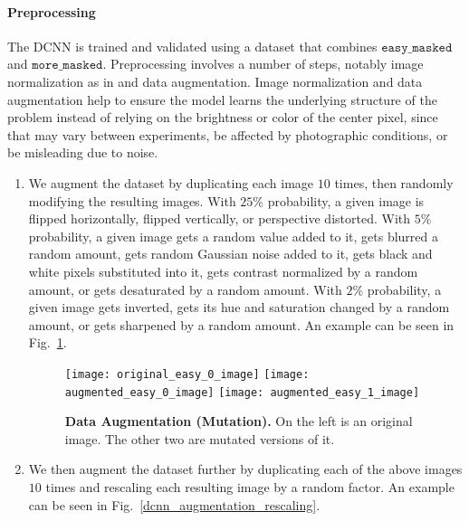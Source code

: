 \documentclass[10pt,letterpaper]{article}
\begin{document}
        \paragraph*{Preprocessing}
            The DCNN is trained and validated using a dataset that combines $\texttt{easy\_masked}$ and $\texttt{more\_masked}$. Preprocessing involves a number of steps, notably image normalization as in \cite{Valen} and data augmentation. Image normalization and data augmentation help to ensure the model learns the underlying structure of the problem instead of relying on the brightness or color of the center pixel, since that may vary between experiments, be affected by photographic conditions, or be misleading due to noise.
    
            \begin{enumerate}
                \item
                    We augment the dataset by duplicating each image $10$ times, then randomly modifying the resulting images. With $25\%$ probability, a given image is flipped horizontally, flipped vertically, or perspective distorted. With $5\%$ probability, a given image gets a random value added to it, gets blurred a random amount, gets random Gaussian noise added to it, gets black and white pixels substituted into it, gets contrast normalized by a random amount, or gets desaturated by a random amount. With $2\%$ probability, a given image gets inverted, gets its hue and saturation changed by a random amount, or gets sharpened by a random amount. An example can be seen in Fig.~\ref{dcnn_augmentation_mutation}.
        
                \begin{figure}[h]
                    \texttt{[image: original\_easy\_0\_image]}
                    \texttt{[image: augmented\_easy\_0\_image]}
                    \texttt{[image: augmented\_easy\_1\_image]}
                    \caption{{\bf Data Augmentation (Mutation).} On the left is an original image. The other two are mutated versions of it.}
                    \label{dcnn_augmentation_mutation}
                \end{figure}
    
            \item
                We then augment the dataset further by duplicating each of the above images $10$ times and rescaling each resulting image by a random factor. An example can be seen in Fig.~\ref{dcnn_augmentation_rescaling}.
    

\end{enumerate}
\end{document}

